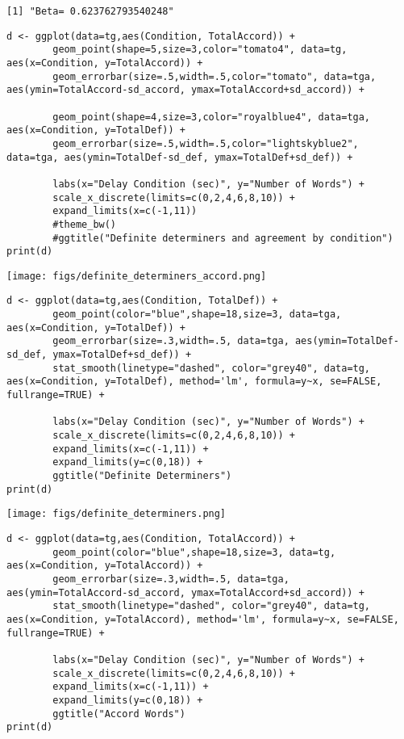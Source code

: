 \documentclass[10pt]{article}
\begin{document}
\begin{verbatim}
[1] "Beta= 0.623762793540248"
\end{verbatim}

\begin{verbatim}
d <- ggplot(data=tg,aes(Condition, TotalAccord)) +
	    geom_point(shape=5,size=3,color="tomato4", data=tg, aes(x=Condition, y=TotalAccord)) +
	    geom_errorbar(size=.5,width=.5,color="tomato", data=tga, aes(ymin=TotalAccord-sd_accord, ymax=TotalAccord+sd_accord)) +

	    geom_point(shape=4,size=3,color="royalblue4", data=tga, aes(x=Condition, y=TotalDef)) +
	    geom_errorbar(size=.5,width=.5,color="lightskyblue2", data=tga, aes(ymin=TotalDef-sd_def, ymax=TotalDef+sd_def)) +

	    labs(x="Delay Condition (sec)", y="Number of Words") +
	    scale_x_discrete(limits=c(0,2,4,6,8,10)) +
	    expand_limits(x=c(-1,11))
	    #theme_bw()
	    #ggtitle("Definite determiners and agreement by condition")
print(d)
\end{verbatim}

\texttt{[image: figs/definite\_determiners\_accord.png]}


\begin{verbatim}
d <- ggplot(data=tg,aes(Condition, TotalDef)) +
	    geom_point(color="blue",shape=18,size=3, data=tga, aes(x=Condition, y=TotalDef)) +
	    geom_errorbar(size=.3,width=.5, data=tga, aes(ymin=TotalDef-sd_def, ymax=TotalDef+sd_def)) +
	    stat_smooth(linetype="dashed", color="grey40", data=tg, aes(x=Condition, y=TotalDef), method='lm', formula=y~x, se=FALSE, fullrange=TRUE) +

	    labs(x="Delay Condition (sec)", y="Number of Words") +
	    scale_x_discrete(limits=c(0,2,4,6,8,10)) +
	    expand_limits(x=c(-1,11)) +
	    expand_limits(y=c(0,18)) +
	    ggtitle("Definite Determiners")
print(d)
\end{verbatim}

\texttt{[image: figs/definite\_determiners.png]}

\begin{verbatim}
d <- ggplot(data=tg,aes(Condition, TotalAccord)) +
	    geom_point(color="blue",shape=18,size=3, data=tg, aes(x=Condition, y=TotalAccord)) +
	    geom_errorbar(size=.3,width=.5, data=tga, aes(ymin=TotalAccord-sd_accord, ymax=TotalAccord+sd_accord)) +
	    stat_smooth(linetype="dashed", color="grey40", data=tg, aes(x=Condition, y=TotalAccord), method='lm', formula=y~x, se=FALSE, fullrange=TRUE) +

	    labs(x="Delay Condition (sec)", y="Number of Words") +
	    scale_x_discrete(limits=c(0,2,4,6,8,10)) +
	    expand_limits(x=c(-1,11)) +
	    expand_limits(y=c(0,18)) +
	    ggtitle("Accord Words")
print(d)
\end{verbatim}
\end{document}
